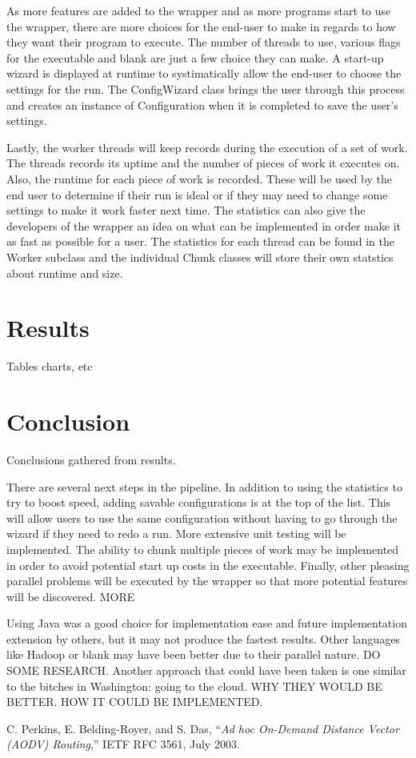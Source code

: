 \documentclass[12pt]{article}
\begin{document}
As more features are added to the wrapper and as more programs start to use the
wrapper, there are more choices for the end-user to make in regards to how they
want their program to execute. The number of threads to use, various flags for
the executable and blank are just a few choice they can make. A start-up wizard
is displayed at runtime to systimatically allow the end-user to choose the
settings for the run. The ConfigWizard class brings the user through this
process and creates an instance of Configuration when it is completed to save
the user's settings.

Lastly, the worker threads will keep records during the execution of a set of 
work. The threads records its uptime and the number of pieces of work it
executes on. Also, the runtime for each piece of work is recorded. These will be
used by the end user to determine if their run is ideal or if they may need to
change some settings to make it work faster next time. The statistics can also
give the developers of the wrapper an idea on what can be implemented in order
make it as fast as possible for a user. The statistics for each thread can be
found in the Worker subclass and the individual Chunk classes will store their
own statstics about runtime and size.

\section{Results}

Tables charts, etc

\section{Conclusion}

Conclusions gathered from results.

There are several next steps in the pipeline. In addition to using the
statistics to try to boost speed, adding savable configurations is at the top of
the list. This will allow users to use the same configuration without having to
go through the wizard if they need to redo a run. More extensive unit testing
will be implemented. The ability to chunk multiple pieces of work may be
implemented in order to avoid potential start up costs in the executable. 
Finally, other  pleasing parallel problems will be executed by the wrapper so 
that more potential features will be discovered. MORE

Using Java was a good choice for implementation ease and future implementation
extension by others, but it may not produce the fastest results. Other languages
like Hadoop or blank may have been better due to their parallel nature. DO SOME
RESEARCH. Another approach that could have been taken is one similar to the
bitches in Washington: going to the cloud. WHY THEY WOULD BE BETTER. HOW IT
COULD BE IMPLEMENTED.



\begin{thebibliography}{1}

C. Perkins,  E. Belding-Royer, and  S. Das, ``\emph{Ad hoc On-Demand
Distance Vector (AODV) Routing},'' IETF RFC 3561, July 2003.

\end{thebibliography}
\end{document}
